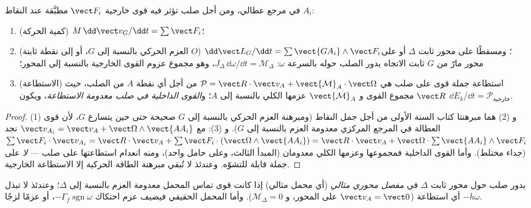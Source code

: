 \begin{theorem}\label{thm:b2:rigid-body-mechanics:laws}
في مرجع عطالي، ومن أجل صلب تؤثر فيه قوى خارجية $\vect F_i$
مطبَّقة عند النقاط $A_i$:
\begin{enumerate}
  \item (كمية الحركة) $M\,\dd\vect v_G/\dd t = \sum\vect F_i$؛
  \item (العزم الحركي بالنسبة إلى $G$، أو إلى نقطة ثابتة $O$)
        $\dd\vect L_G/\dd t = \sum\vect{GA_i}\wedge\vect F_i$؛ ومسقطًا على
        محور ثابت $\Delta$ أو على محور مارّ من $G$ ثابت الاتجاه
        يدور الصلب حوله بالسرعة $\omega$:
        $J_\Delta\,\dd\omega/\dd t = \mathcal M_\Delta$، وهو مجموع عزوم
        القوى الخارجية بالنسبة إلى المحور؛
  \item (الاستطاعة) استطاعة جملة قوى على صلب هي
        $\mathcal P = \vect R\cdot\vect v_A + \vect{\mathcal M}_A\cdot
        \vect\Omega$ من أجل أي نقطة $A$ من الصلب، حيث $\vect R$ مجموع
        القوى و $\vect{\mathcal M}_A$ عزمها الكلي بالنسبة إلى
        $A$؛ و\emph{القوى الداخلية في صلب معدومة
        الاستطاعة}، ويكون $\dd E_k/\dd t = \mathcal P_{\text{خارجية}}$.
\end{enumerate}
\end{theorem}

\begin{proof}
(1) و (2) هما مبرهنتا كتاب السنة الأولى من أجل جمل النقاط
(ومبرهنة العزم الحركي بالنسبة إلى $G$ صحيحة حتى حين يتسارع $G$،
لأن قوى العطالة في المرجع المركزي معدومة العزم بالنسبة إلى
$G$). و (3): مع $\vect v_{A_i} = \vect v_A + \vect\Omega
\wedge\vect{AA_i}$ نجد $\sum\vect F_i\cdot\vect v_{A_i} = \vect R\cdot\vect v_A
+ \sum\vect F_i\cdot(\vect\Omega\wedge\vect{AA_i}) = \vect R\cdot\vect v_A +
\vect\Omega\cdot\sum\vect{AA_i}\wedge\vect F_i$ (جداء مختلط). وأما القوى
الداخلية فمجموعها وعزمها الكلي معدومان (المبدأ الثالث، وعلى
حامل واحد)، ومنه انعدام استطاعتها على صلب --- \emph{لا} على جملة
قابلة للتشوّه. وعندئذ لا تُبقي مبرهنة الطاقة الحركية إلا الاستطاعة الخارجية.
\end{proof}

\begin{definition}\label{def:b2:rigid-body-mechanics:pivot}
يدور صلب حول محور ثابت $\Delta$ في \emph{مفصل محوري مثالي} (أي
محمل مثالي) إذا كانت قوى تماس المحمل معدومة العزم بالنسبة إلى
$\Delta$؛ وعندئذ لا تبذل أي استطاعة ($\vect v_A = \vect 0$ على
المحور، و $\mathcal M_\Delta = 0$). وأما المحمل الحقيقي فيضيف عزم
احتكاك $-\Gamma_f\operatorname{sgn}\omega$، أو عزمًا لزجًا $-h\omega$.
\end{definition}

